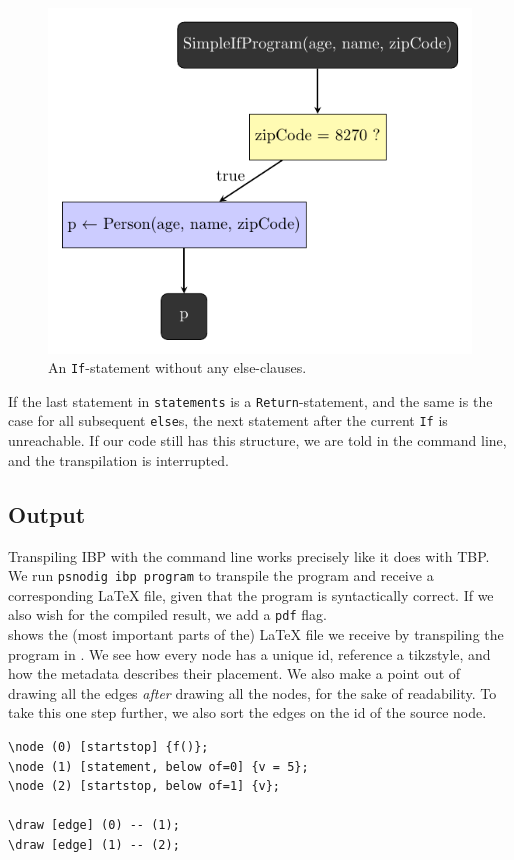 \begin{figure}[ht]
    \centering
    \includegraphics[scale=.72]{assets/chapter4/SimpleIfProgram_ibp.pdf}
    \caption{An \texttt{If}-statement without any else-clauses.}
    \label{flowchartIf2}
\end{figure}

\newpage

If the last statement in \texttt{statements} is a \texttt{Return}-statement, and the same is the case for all subsequent \texttt{else}s, the next statement after the current \texttt{If} is unreachable. If our code still has this structure, we are told in the command line, and the transpilation is interrupted.

\subsection{Output}

Transpiling IBP with the command line works precisely like it does with TBP. We run \texttt{psnodig ibp program} to transpile the program and receive a corresponding LaTeX file, given that the program is syntactically correct. If we also wish for the compiled result, we add a \texttt{pdf} flag. \\

 shows the (most important parts of the) LaTeX file we receive by transpiling the program in . We see how every node has a unique id, reference a tikzstyle, and how the metadata describes their placement. We also make a point out of drawing all the edges \textit{after} drawing all the nodes, for the sake of readability. To take this one step further, we also sort the edges on the id of the source node. \\

\begin{lstlisting}[caption={Excerpt of the LaTeX from transpiling \Cref{Gourmet f} to IBP.}, captionpos=b, label={Example output from compiling Flowchart}]
\node (0) [startstop] {f()};
\node (1) [statement, below of=0] {v = 5};
\node (2) [startstop, below of=1] {v};

\draw [edge] (0) -- (1);
\draw [edge] (1) -- (2);
\end{lstlisting}
